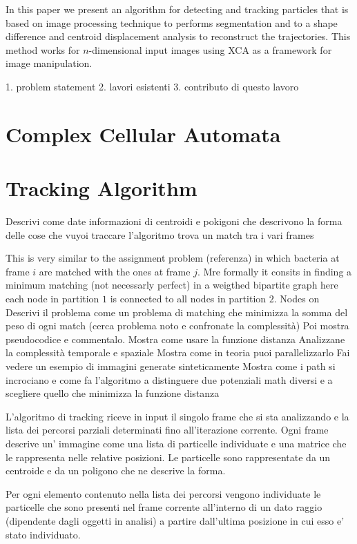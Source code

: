 \documentclass[conference]{IEEEtran}
\begin{document}
In this paper we present an algorithm for detecting and tracking particles that is based on image processing technique to performs segmentation and to a shape difference and centroid displacement analysis to reconstruct the trajectories. This method works for $n$-dimensional input images using XCA as a framework for image manipulation.




1. problem statement
2. lavori esistenti
3. contributo di questo lavoro




\section{Complex Cellular Automata}


\section{Tracking Algorithm}
Descrivi come date informazioni di centroidi e pokigoni che descrivono la forma delle cose che vuyoi traccare l'algoritmo trova un match tra i vari frames

This is very similar to the assignment problem (referenza) in which bacteria at frame $i$ are matched with the ones at frame $j$. Mre formally it consits in finding a minimum matching (not necessarly perfect) in  a weigthed bipartite graph here each node in partition $1$ is connected to all nodes in partition $2$. Nodes on 
Descrivi il problema come un problema di matching che minimizza la somma del peso di ogni match (cerca problema noto e confronate la complessità)
Poi mostra pseudocodice e commentalo.
Mostra come usare la funzione distanza
Analizzane la complessità temporale e spaziale
Mostra come in teoria puoi parallelizzarlo
Fai vedere un esempio di immagini generate sinteticamente
Mostra come i path si incrociano e come fa l'algoritmo a distinguere due potenziali math diversi e a scegliere quello che minimizza la funzione distanza


L'algoritmo di tracking riceve in input il singolo frame che si sta analizzando e la lista dei percorsi parziali determinati fino all'iterazione corrente. Ogni frame descrive un' immagine come una lista di particelle individuate e una matrice che le rappresenta nelle relative posizioni. Le particelle sono rappresentate da un centroide e da un poligono che ne descrive la forma.

Per ogni elemento contenuto nella lista dei percorsi vengono individuate le particelle che sono presenti nel frame corrente all'interno di un dato raggio (dipendente dagli oggetti in analisi) a partire dall'ultima posizione in cui esso e' stato individuato.
\end{document}
